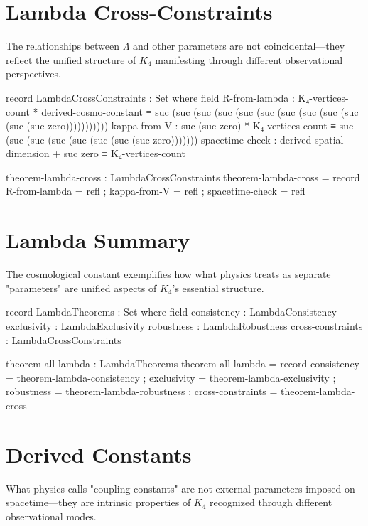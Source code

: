 \documentclass[11pt,a4paper]{book}
\begin{document}
\section{Lambda Cross-Constraints}

The relationships between $\Lambda$ and other parameters are not coincidental—they reflect the unified structure of $K_4$ manifesting through different observational perspectives.

\begin{code}
record LambdaCrossConstraints : Set where
  field
    R-from-lambda      : K₄-vertices-count * derived-cosmo-constant ≡ suc (suc (suc (suc (suc (suc (suc (suc (suc (suc (suc (suc zero)))))))))))
    kappa-from-V       : suc (suc zero) * K₄-vertices-count ≡ suc (suc (suc (suc (suc (suc (suc (suc zero)))))))
    spacetime-check    : derived-spatial-dimension + suc zero ≡ K₄-vertices-count

theorem-lambda-cross : LambdaCrossConstraints
theorem-lambda-cross = record
  { R-from-lambda      = refl
  ; kappa-from-V       = refl
  ; spacetime-check    = refl
  }
\end{code}

\section{Lambda Summary}

The cosmological constant exemplifies how what physics treats as separate "parameters" are unified aspects of $K_4$'s essential structure.

\begin{code}
record LambdaTheorems : Set where
  field
    consistency       : LambdaConsistency
    exclusivity       : LambdaExclusivity
    robustness        : LambdaRobustness
    cross-constraints : LambdaCrossConstraints

theorem-all-lambda : LambdaTheorems
theorem-all-lambda = record
  { consistency       = theorem-lambda-consistency
  ; exclusivity       = theorem-lambda-exclusivity
  ; robustness        = theorem-lambda-robustness
  ; cross-constraints = theorem-lambda-cross
  }
\end{code}

\section{Derived Constants}

What physics calls "coupling constants" are not external parameters imposed on spacetime—they are intrinsic properties of $K_4$ recognized through different observational modes.
\end{document}
